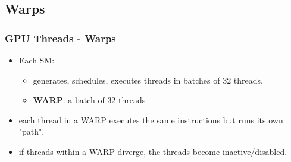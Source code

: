 \subsection{Warps}
\begin{frame}
\frametitle{GPU Threads - Warps}	
\begin{itemize}
  \item Each SM:	
  \begin{itemize}
     \item generates, schedules, executes threads in batches of $32$ threads.
     \item \textbf{WARP}: a batch of $32$ threads
  \end{itemize}
  \item each thread in a WARP executes the same instructions but runs its own "path".
  \item if threads within a WARP diverge, the threads become inactive/disabled.
\end{itemize}	   
\end{frame} 
